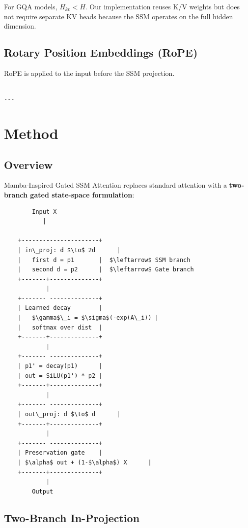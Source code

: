For GQA models, $H_{kv} < H$. Our implementation reuses K/V weights but 
does not require separate KV heads because the SSM operates on the full 
hidden dimension.

\subsection{Rotary Position Embeddings (RoPE)}

RoPE is applied to the input before the SSM projection.
\begin{lstlisting}

---
\end{lstlisting}

\section{Method}

\subsection{Overview}

Mamba-Inspired Gated SSM Attention replaces standard attention with a 
\textbf{two-branch gated state-space formulation}:

\begin{lstlisting}
        Input X
           |
            
    +----------------------+
    | in\_proj: d $\to$ 2d      |
    |   first d = p1       |  $\leftarrow$ SSM branch
    |   second d = p2      |  $\leftarrow$ Gate branch
    +-------+--------------+
            |
    +------- --------------+
    | Learned decay        |
    |   $\gamma$\_i = $\sigma$(-exp(A\_i)) |
    |   softmax over dist  |
    +-------+--------------+
            |
    +------- --------------+
    | p1' = decay(p1)      |
    | out = SiLU(p1') * p2 |
    +-------+--------------+
            |
    +------- --------------+
    | out\_proj: d $\to$ d      |
    +-------+--------------+
            |
    +------- --------------+
    | Preservation gate    |
    | $\alpha$ out + (1-$\alpha$) X      |
    +-------+--------------+
            |
        Output
\end{lstlisting}

\subsection{Two-Branch In-Projection}

